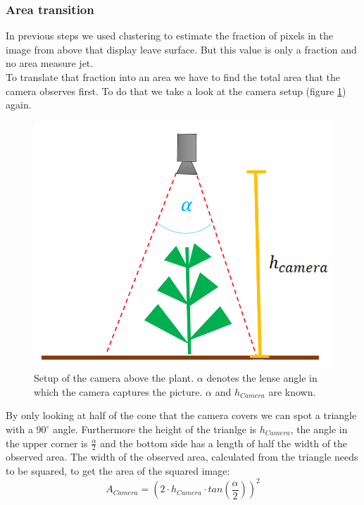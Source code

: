 \graphicspath{{members/tf/figures/}}

\subsubsection{Area transition}


In previous steps we used clustering to estimate the fraction of pixels in the image from above that display leave surface. But this value is only a fraction and no area measure jet.\\
To translate that fraction into an area we have to find the total area that the camera observes first. To do that we take a look at the camera setup (figure \ref{fig:setupAbove}) again.
   \begin{figure}[H]
       \centering
       \includegraphics[scale=0.6]{setupAbove.PNG}
       \caption{Setup of the camera above the plant. $\alpha$ denotes the lense angle in which the camera captures the picture. $\alpha$ and $h_{Camera}$ are known.}
       \label{fig:setupAbove}
   \end{figure}
By only looking at half of the cone that the camera covers we can spot a triangle with a $90^{\circ}$ angle. Furthermore the height of the trianlge is $h_{Camera}$, the angle in the upper corner is $\frac{\alpha}{2}$ and the bottom side has a length of half the width of the observed area. The width of the observed area, calculated from the triangle needs to be squared, to get the area of the squared image:\\
$$A_{Camera} = (2\cdot h_{Camera}\cdot tan(\frac{\alpha}{2}))^2$$
